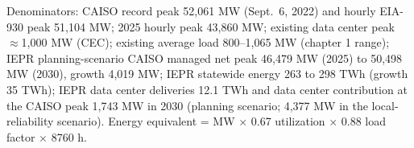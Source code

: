\footnotesize Denominators: CAISO record peak 52,061 MW (Sept.\ 6, 2022) and hourly EIA-930 peak 51,104 MW; 2025 hourly peak 43,860 MW; existing data center peak $\approx$1,000 MW (CEC); existing average load 800--1,065 MW (chapter 1 range); IEPR planning-scenario CAISO managed net peak 46,479 MW (2025) to 50,498 MW (2030), growth 4,019 MW; IEPR statewide energy 263 to 298 TWh (growth 35 TWh); IEPR data center deliveries 12.1 TWh and data center contribution at the CAISO peak 1,743 MW in 2030 (planning scenario; 4,377 MW in the local-reliability scenario). Energy equivalent = MW $\times$ 0.67 utilization $\times$ 0.88 load factor $\times$ 8760 h.